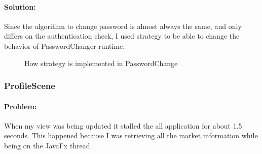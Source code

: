 \documentclass[a4paper,12pt]{report}
\begin{document}
        \paragraph{Solution:}Since the algorithm to change password is almost always the same, and only differs on the authentication check, I used strategy to be able to change the behavior of PasswordChanger runtime.
            \begin{figure}[H]
                \caption{How strategy is implemented in PasswordChange}
                \label{fig:my_label}
            \end{figure}
        
    \subsubsection{ProfileScene}
        \paragraph{Problem:}When my view was being updated it stalled the all application for about 1.5 seconds. This happened because I was retrieving all the market information while being on the JavaFx thread.
\end{document}
